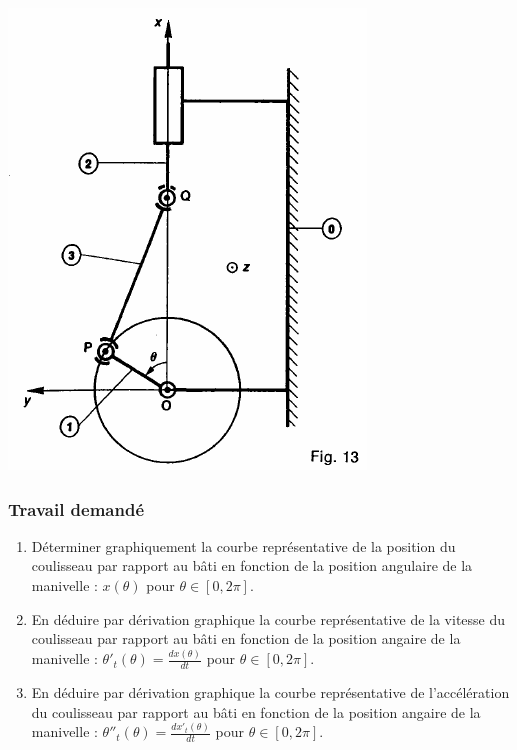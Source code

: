 \begin{center}
    \includegraphics[scale=0.6]{png/bielle.png}
\end{center}

\subsubsection{Travail demandé}
\begin{enumerate}
\item Déterminer graphiquement la courbe représentative de la position du coulisseau par rapport au bâti en fonction de la position angulaire de la manivelle : $x(\theta)$ pour $\theta \in [0,2\pi]$.
\item En déduire par dérivation graphique la courbe représentative de la vitesse du coulisseau par rapport au bâti en fonction de la position angaire de la manivelle : $\theta'_t(\theta)=\frac{dx(\theta)}{dt}$ pour $\theta \in [0,2\pi]$.
\item En déduire par dérivation graphique la courbe représentative de l'accélération du coulisseau par rapport au bâti en fonction de la position angaire de la manivelle : $\theta''_t(\theta)=\frac{dx'_t(\theta)}{dt}$ pour $\theta \in [0,2\pi]$.
\end{enumerate}


